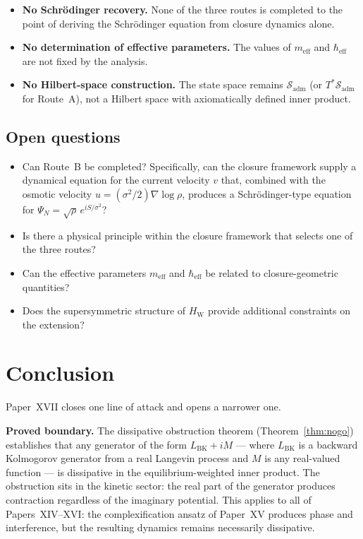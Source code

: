 \documentclass[12pt]{article}
\newcommand{\Sadm}{\mathcal{S}_{\mathrm{adm}}}
\begin{document}
\begin{itemize}
    \item \textbf{No Schr\"odinger recovery.} None of the three routes is completed to the point of deriving the Schr\"odinger equation from closure dynamics alone.
    \item \textbf{No determination of effective parameters.} The values of $m_{\mathrm{eff}}$ and $\hbar_{\mathrm{eff}}$ are not fixed by the analysis.
    \item \textbf{No Hilbert-space construction.} The state space remains $\Sadm$ (or $T^*\Sadm$ for Route~A), not a Hilbert space with axiomatically defined inner product.
\end{itemize}

\subsection{Open questions}

\begin{itemize}
    \item Can Route~B be completed? Specifically, can the closure framework supply a dynamical equation for the current velocity $v$ that, combined with the osmotic velocity $u = (\sigma^2/2)\nabla\log\rho$, produces a Schr\"odinger-type equation for $\Psi_N = \sqrt{\rho}\,e^{iS/\sigma^2}$?
    \item Is there a physical principle within the closure framework that selects one of the three routes?
    \item Can the effective parameters $m_{\mathrm{eff}}$ and $\hbar_{\mathrm{eff}}$ be related to closure-geometric quantities?
    \item Does the supersymmetric structure of $H_{\mathrm{W}}$ provide additional constraints on the extension?
\end{itemize}

\section{Conclusion}\label{sec:conclusion}

Paper~XVII closes one line of attack and opens a narrower one.

\textbf{Proved boundary.} The dissipative obstruction theorem (Theorem~\ref{thm:nogo}) establishes that any generator of the form $L_{\mathrm{BK}} + iM$ --- where $L_{\mathrm{BK}}$ is a backward Kolmogorov generator from a real Langevin process and $M$ is any real-valued function --- is dissipative in the equilibrium-weighted inner product. The obstruction sits in the kinetic sector: the real part of the generator produces contraction regardless of the imaginary potential. This applies to all of Papers~XIV--XVI: the complexification ansatz of Paper~XV produces phase and interference, but the resulting dynamics remains necessarily dissipative.
\end{document}
